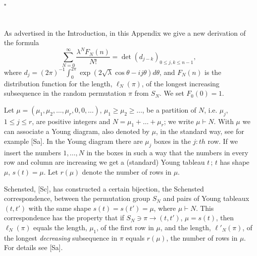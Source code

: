 \documentclass{amsart}
\theoremstyle{definition}
\theoremstyle{remark}
\numberwithin{equation}{section}
\begin{document}
\hfill  $\square$








\appendix 
\section{}

As advertised in the Introduction, in 
this Appendix we give a new derivation of the formula
\begin{equation}\label{a1}
\sum_{N=0}^\infty\frac{\lambda^NF_N(n)}{N!}=
\det(d_{j-k})_{0\le j,k\le n-1},
\end{equation}
where $d_j=(2\pi)^{-1}\int_0^{2\pi}\exp(2\sqrt{\lambda}\cos\theta-ij\theta)
d\theta$, and $F_N(n)$ is the distribution function for the length, 
$\ell_N(\pi)$, of the longest increasing subsequence in the random permutation
$\pi$ from $S_N$. We set $F_0(0)=1$. 
 
Let $\mu=(\mu_1,\mu_2,\dots,\mu_r,0,0,\dots)$, $\mu_1\ge\mu_2\ge\dots$,
be a partition of $N$, i.e. $\mu_j$, $1\le j\le r$, are positive integers and
$N=\mu_1+\dots+\mu_r$; we write $\mu\vdash N$. With $\mu$ we can associate 
a Young diagram, also denoted by $\mu$, in the standard way, see for example
[Sa]. In the Young diagram there are $\mu_j$ boxes in the $j:th$ row. If we
insert the numbers $1,\dots, N$ in the boxes in such a way that the numbers 
in every row and column are increasing we get a (standard) Young tableau
$t\,$; $t$ has shape $\mu$, $s(t)=\mu$. Let $r(\mu)$ denote the number of
rows in $\mu$.
 
Schensted, [Sc], has constructed a certain bijection, the Schensted
correspondence, between the permutation group $S_N$ and pairs of
Young tableaux $(t,t')$ with the same shape $s(t)=s(t')=\mu$, where
$\mu\vdash N$. This correspondence has the property that if $S_N\owns
\pi\to (t,t')$, $\mu=s(t)$, then $\ell_N(\pi)$ equals the length, $\mu_1$, 
of the first row in $\mu$, and the length, $\ell'_N(\pi)$, of the longest
{\it decreasing} subsequence in $\pi$ equals $r(\mu)$, the number of rows 
in $\mu$. For details see [Sa].
 
\end{document}
